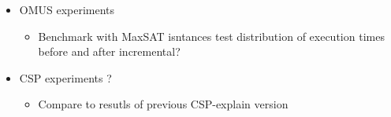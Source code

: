 
\begin{itemize}
    \item OMUS experiments
    \begin{itemize}
        \item Benchmark with MaxSAT isntances test distribution of execution times before and after incremental? 
    \end{itemize}
    \item CSP experiments ? 
    \begin{itemize}
        \item Compare to resutls of previous CSP-explain version
    \end{itemize}
\end{itemize}



